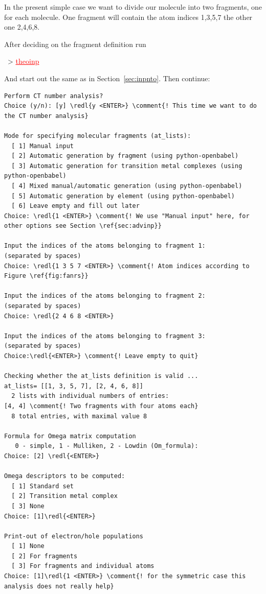 \documentclass[DIV=12,headings=normal]{scrartcl}
\newcommand{\comment}[1]{\textcolor{blue}{#1}}
\newcommand{\redl}[1]{{\textcolor{red}{\underline{#1}}}}
\newcommand{\comm}[1]{
\small
~> \redl{#1}
\normalsize
}
\newcounter{number}
\begin{document}
In the present simple case we want to divide our molecule into two fragments, one for each molecule.
One fragment will contain the atom indices 1,3,5,7 the other one 2,4,6,8.

After deciding on the fragment definition run 

\comm{theoinp}

And start out the same as in Section~\ref{sec:inpnto}. Then continue:

\scriptsize
\begin{Verbatim}[commandchars=\\\{\}]
Perform CT number analysis?
Choice (y/n): [y] \redl{y <ENTER>} \comment{! This time we want to do the CT number analysis}

Mode for specifying molecular fragments (at_lists):
  [ 1] Manual input
  [ 2] Automatic generation by fragment (using python-openbabel)
  [ 3] Automatic generation for transition metal complexes (using python-openbabel)
  [ 4] Mixed manual/automatic generation (using python-openbabel)
  [ 5] Automatic generation by element (using python-openbabel)
  [ 6] Leave empty and fill out later
Choice: \redl{1 <ENTER>} \comment{! We use "Manual input" here, for other options see Section \ref{sec:advinp}}

Input the indices of the atoms belonging to fragment 1:
(separated by spaces)
Choice: \redl{1 3 5 7 <ENTER>} \comment{! Atom indices according to Figure \ref{fig:fanrs}}

Input the indices of the atoms belonging to fragment 2:
(separated by spaces)
Choice: \redl{2 4 6 8 <ENTER>}

Input the indices of the atoms belonging to fragment 3:
(separated by spaces)
Choice:\redl{<ENTER>} \comment{! Leave empty to quit}

Checking whether the at_lists definition is valid ...
at_lists= [[1, 3, 5, 7], [2, 4, 6, 8]]
  2 lists with individual numbers of entries:
[4, 4] \comment{! Two fragments with four atoms each}
  8 total entries, with maximal value 8

Formula for Omega matrix computation
   0 - simple, 1 - Mulliken, 2 - Lowdin (Om_formula):
Choice: [2] \redl{<ENTER>}

Omega descriptors to be computed:
  [ 1] Standard set
  [ 2] Transition metal complex
  [ 3] None
Choice: [1]\redl{<ENTER>}

Print-out of electron/hole populations
  [ 1] None
  [ 2] For fragments
  [ 3] For fragments and individual atoms
Choice: [1]\redl{1 <ENTER>} \comment{! for the symmetric case this analysis does not really help}


\end{Verbatim}
\end{document}

